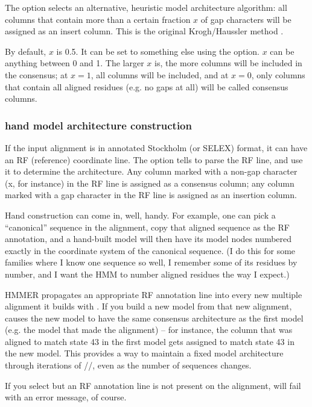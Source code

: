 The  option selects an alternative, heuristic model
architecture algorithm: all columns that contain more than a certain
fraction $x$ of gap characters will be assigned as an insert column.
This is the original Krogh/Haussler method \cite{Krogh94}.

By default, $x$ is 0.5. It can be set to something else using the
 option. $x$ can be anything between 0 and 1.  The
larger $x$ is, the more columns will be included in the consensus; at
$x=1$, all columns will be included, and at $x=0$, only columns that
contain all aligned residues (e.g. no gaps at all) will be called
consensus columns.

\subsubsection{hand model architecture construction}

If the input alignment is in annotated Stockholm (or SELEX) format, it
can have an RF (reference) coordinate line. The  option
tells  to parse the RF line, and use it to determine
the architecture. Any column marked with a non-gap character (x, for
instance) in the RF line is assigned as a consensus column; any column
marked with a gap character in the RF line is assigned as an insertion
column.

Hand construction can come in, well, handy. For example, one can pick
a ``canonical'' sequence in the alignment, copy that aligned sequence
as the RF annotation, and a hand-built model will then have its model
nodes numbered exactly in the coordinate system of the canonical
sequence. (I do this for some families where I know one sequence so
well, I remember some of its residues by number, and I want the HMM to
number aligned residues the way I expect.)

HMMER propagates an appropriate RF annotation line into every new
multiple alignment it builds with . If you build a new
model from that new alignment,  causes the new
model to have the same consensus architecture as the first model
(e.g. the model that made the alignment) -- for instance, the column
that was aligned to match state 43 in the first model gets assigned to
match state 43 in the new model. This provides a way to maintain a
fixed model architecture through iterations of
//, even as the number
of sequences changes.

If you select  but an RF annotation line is not present
on the alignment,  will fail with an error message, of
course.


